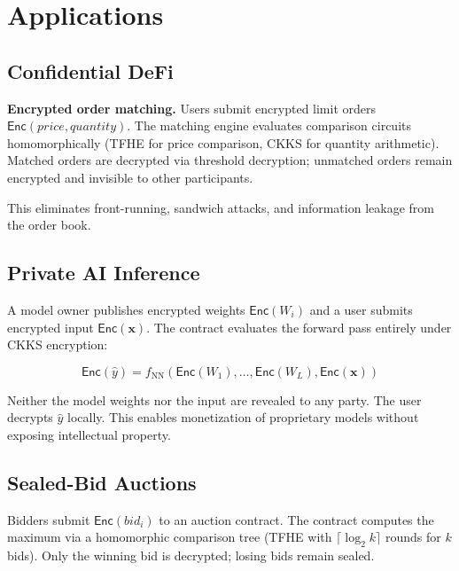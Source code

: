 \documentclass[11pt,letterpaper]{article}
\theoremstyle{definition}
\theoremstyle{remark}
\newcommand{\TFHE}{\textsc{TFHE}}
\newcommand{\CKKS}{\textsc{CKKS}}
\begin{document}
\section{Applications}
\label{sec:apps}

\subsection{Confidential DeFi}

\textbf{Encrypted order matching.} Users submit encrypted limit orders $\mathsf{Enc}(\mathit{price}, \mathit{quantity})$. The matching engine evaluates comparison circuits homomorphically (\TFHE{} for price comparison, \CKKS{} for quantity arithmetic). Matched orders are decrypted via threshold decryption; unmatched orders remain encrypted and invisible to other participants.

This eliminates front-running, sandwich attacks, and information leakage from the order book.

\subsection{Private AI Inference}

A model owner publishes encrypted weights $\mathsf{Enc}(W_i)$ and a user submits encrypted input $\mathsf{Enc}(\mathbf{x})$. The contract evaluates the forward pass entirely under \CKKS{} encryption:

\begin{equation}
  \mathsf{Enc}(\hat{y}) = f_{\mathrm{NN}}(\mathsf{Enc}(W_1), \ldots, \mathsf{Enc}(W_L), \mathsf{Enc}(\mathbf{x}))
\end{equation}

Neither the model weights nor the input are revealed to any party. The user decrypts $\hat{y}$ locally. This enables monetization of proprietary models without exposing intellectual property.

\subsection{Sealed-Bid Auctions}

Bidders submit $\mathsf{Enc}(\mathit{bid}_i)$ to an auction contract. The contract computes the maximum via a homomorphic comparison tree (\TFHE{} with $\lceil \log_2 k \rceil$ rounds for $k$ bids). Only the winning bid is decrypted; losing bids remain sealed.
\end{document}
